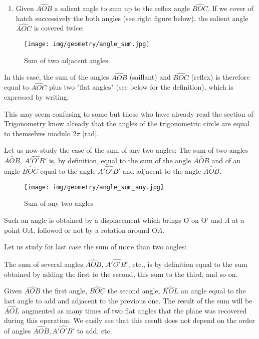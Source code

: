 \begin{enumerate}
\begin{enumerate}
			
			\item Given $\widehat{AOB}$ a salient angle to sum up to the reflex angle $\widehat{BOC}$. If we cover of hatch successively the both angles (see right figure below), the salient angle $\widehat{AOC}$ is covered twice:
		\end{enumerate}
		\begin{figure}[H]
			\centering
			\texttt{[image: img/geometry/angle\_sum.jpg]}
			\caption{Sum of two adjacent angles}
		\end{figure}
		In this case, the sum of the angles $\widehat{AOB}$ (saillant) and $\widehat{BOC}$ (reflex) is therefore equal to $\widehat{AOC}$ plus two "flat angles" (see below for the definition), which is expressed by writing:
		
		\begin{tcolorbox}[title=Remark,colframe=black,arc=10pt]
		This may seem confusing to some but those who have already read the section of Trigonometry know already that the angles of the trigonometric circle are equal to themselves modulo $2\pi$ [rad].
		\end{tcolorbox}
		Let us now study the case of the sum of any two angles:
		The sum of two angles $\hat{AOB}$, $\widehat{A'O'B'}$ is, by definition, equal to the sum of the angle $\widehat{AOB}$ and of an angle $\widehat{BOC}$ equal to the angle $\widehat{A'O'B'}$ and adjacent to the angle $\widehat{AOB}$.
		\begin{figure}[H]
			\centering
			\texttt{[image: img/geometry/angle\_sum\_any.jpg]}
			\caption{Sum of any two angles}
		\end{figure}
		Such an angle is obtained by a displacement which brings O on O' and $A$ at a point O$A$, followed or not by a rotation around O$A$.
		
		Let us study for last case the sum of more than two angles:
		
		The sum of several angles $\widehat{AOB}$, $\widehat{A'O'B'}$, etc., is by definition equal to the sum obtained by adding the first to the second, this sum to the third, and so on.
		
		Given $\widehat{AOB}$ the first angle, $\widehat{BOC}$ the second angle, $\widehat{KOL}$ an angle equal to the last angle to add and adjacent to the previous one. The result of the sum will be $\widehat{AOL}$ augmented as many times of two flat angles that the plane was recovered during this operation. We easily see that this result does not depend on the order of angles $\widehat{AOB},\widehat{A'O'B'}$ to add, etc.
	

\end{enumerate}
